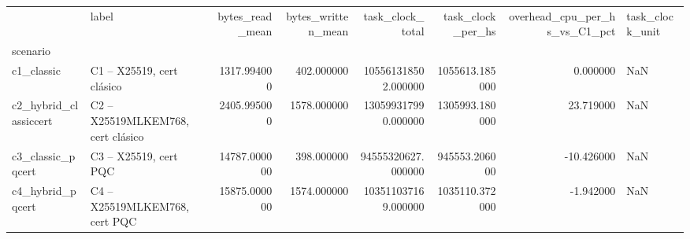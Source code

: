 \begin{tabular}{llrrrrrl}
\toprule
 & label & bytes_read_mean & bytes_written_mean & task_clock_total & task_clock_per_hs & overhead_cpu_per_hs_vs_C1_pct & task_clock_unit \\
scenario &  &  &  &  &  &  &  \\
\midrule
c1_classic & C1 – X25519, cert clásico & 1317.994000 & 402.000000 & 105561318502.000000 & 1055613.185000 & 0.000000 & NaN \\
c2_hybrid_classiccert & C2 – X25519MLKEM768, cert clásico & 2405.995000 & 1578.000000 & 130599317990.000000 & 1305993.180000 & 23.719000 & NaN \\
c3_classic_pqcert & C3 – X25519, cert PQC & 14787.000000 & 398.000000 & 94555320627.000000 & 945553.206000 & -10.426000 & NaN \\
c4_hybrid_pqcert & C4 – X25519MLKEM768, cert PQC & 15875.000000 & 1574.000000 & 103511037169.000000 & 1035110.372000 & -1.942000 & NaN \\
\bottomrule
\end{tabular}
